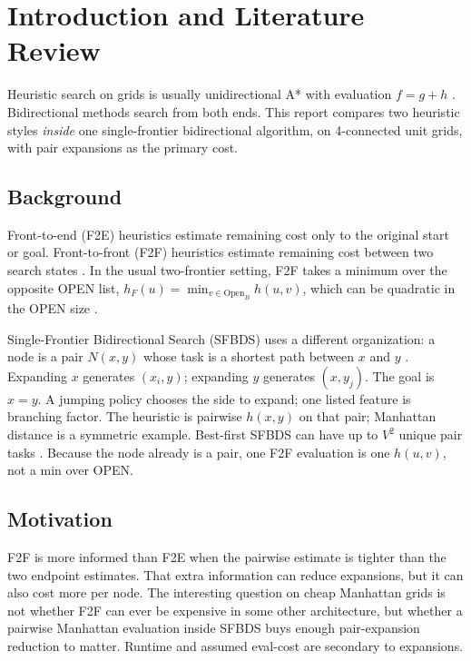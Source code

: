 \section{Introduction and Literature Review}

Heuristic search on grids is usually unidirectional A* with evaluation \(f=g+h\) \cite{hart1968astar}. Bidirectional methods search from both ends. This report compares two heuristic styles \emph{inside} one single-frontier bidirectional algorithm, on 4-connected unit grids, with pair expansions as the primary cost.

\subsection{Background}

Front-to-end (F2E) heuristics estimate remaining cost only to the original start or goal. Front-to-front (F2F) heuristics estimate remaining cost between two search states \cite{barker2015f2e}. In the usual two-frontier setting, F2F takes a minimum over the opposite OPEN list, \(h_F(u)=\min_{v\in\mathrm{Open}_B}h(u,v)\), which can be quadratic in the OPEN size \cite{siag2023socs}.

Single-Frontier Bidirectional Search (SFBDS) uses a different organization: a node is a pair \(N(x,y)\) whose task is a shortest path between \(x\) and \(y\) \cite{felner2010sfbds}. Expanding \(x\) generates \((x_i,y)\); expanding \(y\) generates \((x,y_j)\). The goal is \(x=y\). A jumping policy chooses the side to expand; one listed feature is branching factor. The heuristic is pairwise \(h(x,y)\) on that pair; Manhattan distance is a symmetric example. Best-first SFBDS can have up to \(V^2\) unique pair tasks \cite{felner2010sfbds}. Because the node already is a pair, one F2F evaluation is one \(h(u,v)\), not a min over OPEN.

\subsection{Motivation}

F2F is more informed than F2E when the pairwise estimate is tighter than the two endpoint estimates. That extra information can reduce expansions, but it can also cost more per node. The interesting question on cheap Manhattan grids is not whether F2F can ever be expensive in some other architecture, but whether a pairwise Manhattan evaluation inside SFBDS buys enough pair-expansion reduction to matter. Runtime and assumed eval-cost are secondary to expansions.

